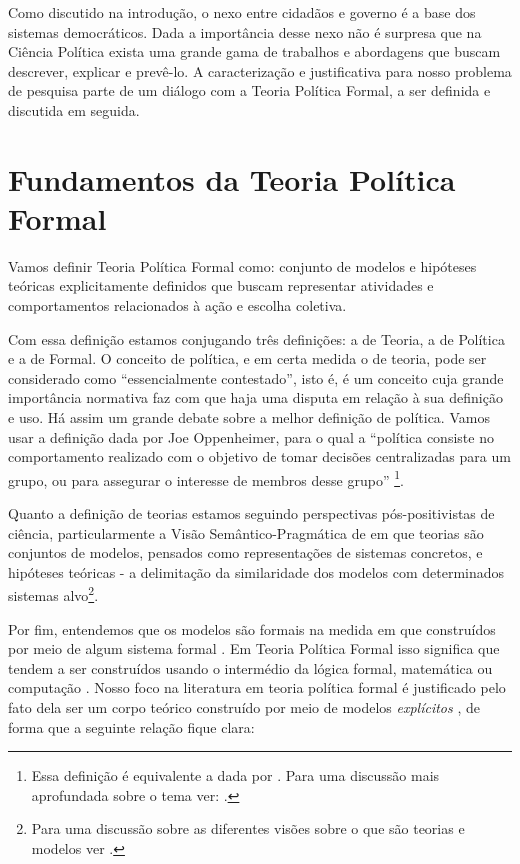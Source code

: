 Como discutido na introdução, o nexo entre cidadãos e governo é a base dos
sistemas democráticos. Dada a importância desse nexo não é surpresa que na
Ciência Política exista uma grande gama de trabalhos e abordagens que buscam
descrever, explicar e prevê-lo. A caracterização e justificativa para nosso
problema de pesquisa parte de um diálogo com a Teoria Política Formal, a ser
definida e discutida em seguida.

\section{Fundamentos da Teoria Política Formal}

Vamos definir Teoria Política Formal como: conjunto de modelos e hipóteses
teóricas explicitamente definidos que buscam representar atividades e
comportamentos relacionados à ação e escolha coletiva.

Com essa definição estamos conjugando três definições: a de Teoria, a de
Política e a de Formal. O conceito de política, e em certa medida o de teoria,
pode ser considerado como ``essencialmente contestado'', isto é, é um conceito
cuja grande importância normativa faz com que haja uma disputa em relação à sua
definição e uso\cite{collier2006essentially}. Há assim um grande debate
sobre a melhor definição de  política. Vamos usar a definição
dada por Joe Oppenheimer, para o qual  a ``política consiste
no comportamento realizado com o objetivo de tomar decisões centralizadas para
um grupo, ou para assegurar o interesse de membros desse grupo'' \cite[p.
I]{oppenheimer2012principles}\footnote{Essa definição é equivalente a dada por
  . Para uma discussão mais aprofundada sobre o
  tema ver: .}.

Quanto a definição de teorias estamos seguindo perspectivas pós-positivistas de
ciência, particularmente a Visão Semântico-Pragmática de
 em que teorias são conjuntos de modelos, pensados
como representações de sistemas concretos, e hipóteses teóricas - a delimitação
da similaridade dos modelos com determinados sistemas alvo\footnote{Para uma
  discussão sobre as diferentes visões sobre o que são teorias e modelos ver
  .}.

Por fim, entendemos que os modelos são formais na medida em que construídos por
meio de algum sistema formal \cite{wong2015formal}. Em Teoria Política Formal
isso significa que tendem a ser construídos usando o intermédio da lógica formal,
matemática ou computação \cite{morton1999methods}. Nosso foco na literatura em
teoria política formal é justificado pelo fato dela ser um corpo teórico
construído por meio de modelos \textit{explícitos} \cite{epstein2008model}, de
forma que a seguinte relação fique clara:

